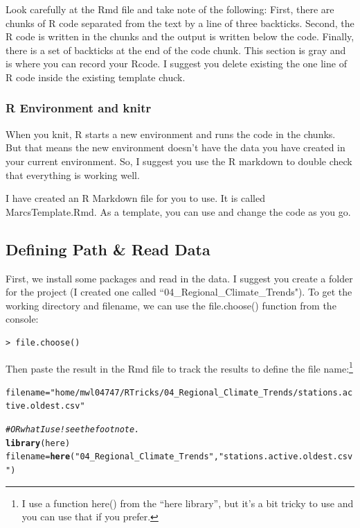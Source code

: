 \documentclass{article}\usepackage[]{graphicx}\usepackage[dvipsnames]{xcolor}
\makeatletter
\newcommand{\hlstr}[1]{\textcolor[rgb]{0.192,0.494,0.8}{#1}}%
\newcommand{\hlcom}[1]{\textcolor[rgb]{0.678,0.584,0.686}{\textit{#1}}}%
\newcommand{\hlstd}[1]{\textcolor[rgb]{0.345,0.345,0.345}{#1}}%
\newcommand{\hlkwb}[1]{\textcolor[rgb]{0.69,0.353,0.396}{#1}}%
\newcommand{\hlkwd}[1]{\textcolor[rgb]{0.737,0.353,0.396}{\textbf{#1}}}%
\newenvironment{kframe}{%
 \def\at@end@of@kframe{}%
 \ifinner\ifhmode%
  \def\at@end@of@kframe{\end{minipage}}%
  \begin{minipage}{\columnwidth}%
 \fi\fi%
 \def\FrameCommand##1{\hskip\@totalleftmargin \hskip-\fboxsep
 \colorbox{shadecolor}{##1}\hskip-\fboxsep
     \hskip-\linewidth \hskip-\@totalleftmargin \hskip\columnwidth}%
 \MakeFramed {\advance\hsize-\width
   \@totalleftmargin\z@ \linewidth\hsize
   \@setminipage}}%
 {\par\unskip\endMakeFramed%
 \at@end@of@kframe}
\newenvironment{knitrout}{}{} %
\makeatother
\begin{document}
Look carefully at the Rmd file and take note of the following: First, there are chunks of R code separated from the text by a line of three backticks. Second, the R code is written in the chunks and the output is written below the code. Finally, there is a set of backticks at the end of the code chunk. This section is gray and is where you can record your Rcode. I suggest you delete existing the one line of R code inside the existing template chuck.  

\subsubsection{R Environment and knitr}

When you knit, R starts a new environment and runs the code in the chunks. But that means the new environment doesn't have the data you have created in your current environment. So, I suggest you use the R markdown to double check that everything is working well. 

I have created an R Markdown file for you to use. It is called MarcsTemplate.Rmd. As a template, you can use and change the code as you go. 

\subsection{Defining Path \& Read Data}

First, we install some packages and read in the data. I suggest you create a folder for the project (I created one called ``04\_Regional\_Climate\_Trends").  To get the working directory and filename, we can use the file.choose() function from the console:

\begin{verbatim}
> file.choose()
\end{verbatim}

Then paste the result in the Rmd file to track the results to define the file name:\footnote{I use a function here() from the ``here library'', but it's a bit tricky to use and you can use that if you prefer.}

\begin{knitrout}
\color{fgcolor}\begin{kframe}
\begin{alltt}
\hlstd{filename} \hlkwb{=} \hlstr{"home/mwl04747/RTricks/04_Regional_Climate_Trends/stations.active.oldest.csv"}


\hlcom{# OR what I use! see the footnote.}
\hlkwd{library}\hlstd{(here)}
\hlstd{filename} \hlkwb{=} \hlkwd{here}\hlstd{(}\hlstr{"04_Regional_Climate_Trends"}\hlstd{,} \hlstr{"stations.active.oldest.csv"}\hlstd{)}
\end{alltt}
\end{kframe}
\end{knitrout}
\end{document}
